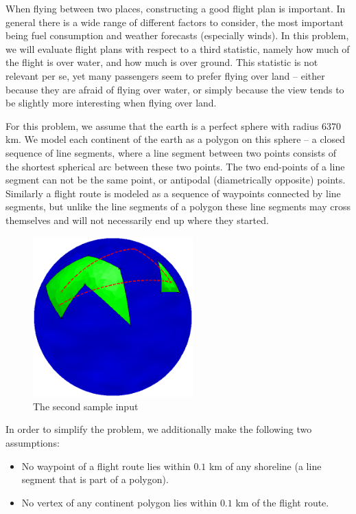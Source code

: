 
When flying between two places, constructing a good flight plan is
important.  In general there is a wide range of different factors to
consider, the most important being fuel consumption and weather
forecasts (especially winds).  In this problem, we will evaluate
flight plans with respect to a third statistic, namely how much of the
flight is over water, and how much is over ground.  This statistic is
not relevant per se, yet many passengers seem to prefer flying over
land -- either because they are afraid of flying over water, or simply
because the view tends to be slightly more interesting when flying
over land.

For this problem, we assume that the earth is a perfect sphere with
radius $6370$ km.  We model each continent of the earth as a polygon
on this sphere -- a closed sequence of line segments, where a line
segment between two points consists of the shortest spherical arc
between these two points.  The two end-points of a line segment can
not be the same point, or antipodal (diametrically opposite) points.
Similarly a flight route is modeled as a sequence of waypoints
connected by line segments, but unlike the line segments of a polygon
these line segments may cross themselves and will not necessarily end
up where they started.

\begin{figure}[!h]
  \centering
  \includegraphics[width=0.55\textwidth]{sample1}
  \caption{The second sample input}
\end{figure}

In order to simplify the problem, we additionally make the following
two assumptions:
\begin{itemize}
\item No waypoint of a flight route lies within $0.1$ km of any shoreline (a line segment that is part of a polygon).
\item No vertex of any continent polygon lies within $0.1$ km of the flight route.
\end{itemize} 

